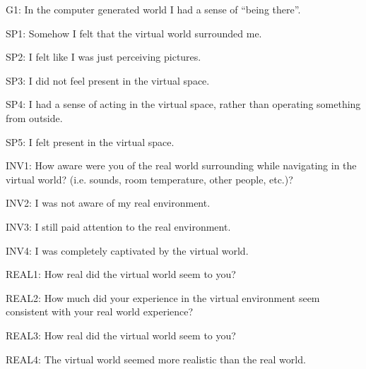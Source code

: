 \documentclass[oneside]{book}
\begin{document}
\begin{flushleft}

G1: In the computer generated world I had a sense of ``being there''.

\vspace{4mm}


SP1: Somehow I felt that the virtual world surrounded me.

\vspace{4mm}

SP2: I felt like I was just perceiving pictures.

\vspace{4mm}

SP3: I did not feel present in the virtual space.

\vspace{4mm}

SP4: I had a sense of acting in the virtual space, rather than operating something from outside.

\vspace{4mm}

SP5: I felt present in the virtual space.

\vspace{4mm}


INV1: How aware were you of the real world surrounding while navigating in the virtual world? (i.e. sounds, room temperature, other people, etc.)?

\vspace{4mm}

INV2: I was not aware of my real environment.

\vspace{4mm}

INV3: I still paid attention to the real environment.

\vspace{4mm}

INV4: I was completely captivated by the virtual world.


\vspace{4mm}

REAL1: How real did the virtual world seem to you?

\vspace{4mm}

REAL2: How much did your experience in the virtual environment seem consistent with your real world experience?

\vspace{4mm}

REAL3: How real did the virtual world seem to you?

\vspace{4mm}

REAL4: The virtual world seemed more realistic than the real world.

\end{flushleft}



\end{document}
